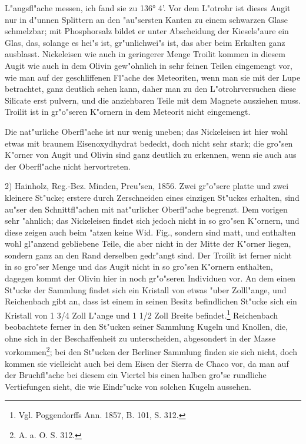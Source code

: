 \documentclass[a4paper, 11pt, oneside]{article}
\begin{document}
L"angsfl"ache messen, ich fand sie zu 136° 4’. Vor dem L"otrohr ist dieses Augit nur in d"unnen Splittern an den "au"sersten Kanten zu einem schwarzen Glase schmelzbar; mit Phosphorsalz bildet er unter Abscheidung der Kiesels"aure ein Glas, das, solange es hei"s ist, gr"unlichwei"s ist, das aber beim Erkalten ganz ausblasst. Nickeleisen wie auch in geringerer Menge Troilit kommen in diesem Augit wie auch in dem Olivin gew"ohnlich in sehr feinen Teilen eingemengt vor, wie man auf der geschliffenen Fl"ache des Meteoriten, wenn man sie mit der Lupe betrachtet, ganz deutlich sehen kann, daher man zu den L"otrohrversuchen diese Silicate erst pulvern, und die anziehbaren Teile mit dem Magnete ausziehen muss. Troilit ist in gr"o"seren K"ornern in dem Meteorit nicht eingemengt.

Die nat"urliche Oberfl"ache ist nur wenig uneben; das Nickeleisen ist hier wohl etwas mit braunem Eisenoxydhydrat bedeckt, doch nicht sehr stark; die gro"sen K"orner von Augit und Olivin sind ganz deutlich zu erkennen, wenn sie auch aus der Oberfl"ache nicht hervortreten.

2) Hainholz, Reg.-Bez. Minden, Preu"sen, 1856. Zwei gr"o"sere platte und zwei kleinere St"ucke; erstere durch Zerschneiden eines einzigen St"uckes erhalten, sind au"ser den Schnittfl"achen mit nat"urlicher Oberfl"ache begrenzt. Dem vorigen sehr "ahnlich; das Nickeleisen findet sich jedoch nicht in so gro"sen K"ornern, und diese zeigen auch beim "atzen keine Wid. Fig., sondern sind matt, und enthalten wohl gl"anzend gebliebene Teile, die aber nicht in der Mitte der K"orner liegen, sondern ganz an den Rand derselben gedr"angt sind. Der Troilit ist ferner nicht in so gro"ser Menge und das Augit nicht in so gro"sen K"ornern enthalten, dagegen kommt der Olivin hier in noch gr"o"seren Individuen vor. An dem einen St"ucke der Sammlung findet sich ein Kristall von etwas "uber Zolll"ange, und Reichenbach gibt an, dass ist einem in seinen Besitz befindlichen St"ucke sich ein Kristall von 1 3/4 Zoll L"ange und 1 1/2 Zoll Breite befindet.\footnote{Vgl. Poggendorffs Ann. 1857, B. 101, S. 312.} Reichenbach beobachtete ferner in den St"ucken seiner Sammlung Kugeln und Knollen, die, ohne sich in der Beschaffenheit zu unterscheiden, abgesondert in der Masse vorkommen\footnote{A. a. O. S. 312.}; bei den St"ucken der Berliner Sammlung finden sie sich nicht, doch kommen sie vielleicht auch bei dem Eisen der Sierra de Chaco vor, da man auf der Bruchfl"ache bei diesem ein Viertel bis einen halben gro"se rundliche Vertiefungen sieht, die wie Eindr"ucke von solchen Kugeln aussehen.
\end{document}
